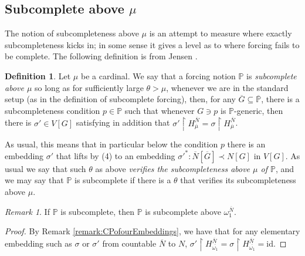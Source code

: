\documentclass{amsart}
\theoremstyle{definition}
\newtheorem{definition}[theorem]{Definition}
\theoremstyle{remark}
\newtheorem{remark}[theorem]{Remark}
\renewcommand{\P}{\mathbb{P}}
\newcommand{\N}{{\overline{N}}}
\newcommand{\G}{\overline{G}}
\newcommand{\rest}{\mathbin{\upharpoonright}}
\begin{document}
\subsection{Subcomplete above $\mu$} \label{subsec:subcompleteabovemu}
The notion of subcompleteness above $\mu$ is an attempt to measure where exactly subcompleteness kicks in; in some sense it gives a level as to where forcing fails to be complete. The following definition is from Jensen \cite[Chapter 2 p.\ 47]{Jensen:2009fe}.
\begin{definition} 
Let $\mu$ be a cardinal. We say that a forcing notion $\P$ is \emph{subcomplete above $\mu$} so long as for sufficiently large $\theta > \mu$, whenever we are in the standard setup (as in the definition of subcomplete forcing),
then, for any $\G \subseteq \overline{\P}$, there is a subcompleteness condition $p \in \P$ such that whenever $G \ni p$ is $\P$-generic, then there is $\sigma' \in V[G]$ satisfying in addition that $\sigma' \rest H_{\overline \mu}^{\N} = \sigma \rest H_{\overline \mu}^{\N}$.

As usual, this means that in particular below the condition $p$ there is an embedding $\sigma'$ that lifts by (4) to an embedding $\sigma'^*:\N[\G] \prec N[G]$ in $V[G]$. As usual we say that such $\theta$ as above \textit{verifies the subcompleteness above $\mu$ of $\P$}, and we may say that $\P$ is subcomplete if there is a $\theta$ that verifies its subcompleteness above $\mu$.
\end{definition}

\begin{remark} If $\P$ is subcomplete, then $\P$ is subcomplete above $\omega_1^{\N}$. \end{remark}
\begin{proof} By Remark \ref{remark:CPofourEmbeddings}, we have that for any elementary embedding such as $\sigma$ or $\sigma'$ from countable $\N$ to $N$, $\sigma' \rest H_{\overline{\omega_1}}^{\N} = \sigma \rest H_{\overline{\omega_1}}^{\N} = \text{id}$. \end{proof}
\end{document}
